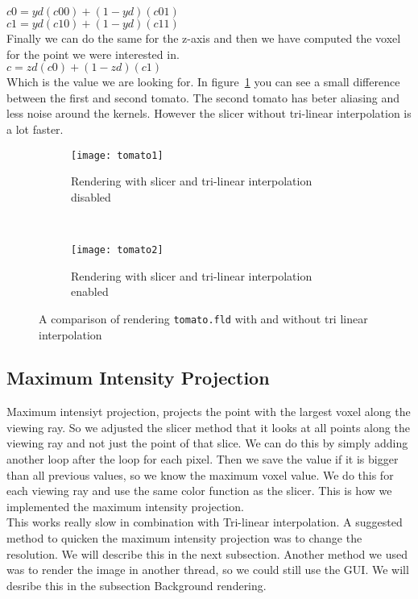 $c0= yd(c00)+(1-yd)(c01)$\\
$c1= yd(c10)+(1-yd)(c11)$\\
Finally we can do the same for the z-axis and then we have computed the voxel for the point we were interested in.\\
$c= zd(c0)+(1-zd)(c1)$\\
Which is the value we are looking for. 
In figure~\ref{fig:interpolation} you can see a small difference between the first and second tomato.
The second tomato has beter aliasing and less noise around the kernels. 
However the slicer without tri-linear interpolation is a lot faster. 
\begin{figure}[H]
	\centering
	\begin{subfigure}[t]{0.45\textwidth}
		\texttt{[image: tomato1]}
		\caption{Rendering with slicer and tri-linear interpolation disabled}
	\end{subfigure}
	~%
	\begin{subfigure}[t]{0.45\textwidth}
		\texttt{[image: tomato2]}
		\caption{Rendering with slicer and tri-linear interpolation enabled}
	\end{subfigure}
	\caption{A comparison of rendering \texttt{tomato.fld} with and without tri linear interpolation}
	\label{fig:interpolation}
\end{figure}
\subsection{Maximum Intensity Projection}
Maximum intensiyt projection, projects the point with the largest voxel along the viewing ray. 
So we adjusted the slicer method that it looks at all points along the viewing ray and not just the point of that slice. 
We can do this by simply adding another loop after the loop for each pixel. 
Then we save the value if it is bigger than all previous values, so we know the maximum voxel value.
We do this for each viewing ray and use the same color function as the slicer. 
This is how we implemented the maximum intensity projection. \\
 This works really slow in combination with Tri-linear interpolation.
 A suggested method to quicken the maximum intensity projection was to change the resolution. 
 We will describe this in the next subsection. 
 Another method we used was to render the image in another thread, so we could still use the GUI.
We will desribe this in the subsection Background rendering.
